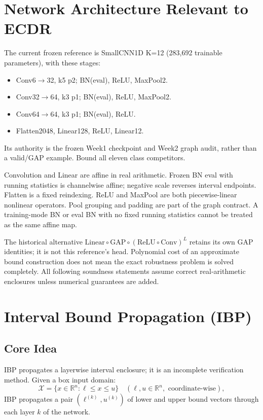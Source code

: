 \documentclass[11pt, a4paper]{article}
\theoremstyle{definition}
\theoremstyle{plain}
\newcommand{\R}{\mathbb{R}}
\begin{document}
\section{Network Architecture Relevant to ECDR}

The current frozen reference is SmallCNN1D K=12 (283,692 trainable
parameters), with these stages:
\begin{itemize}[leftmargin=1.5em]
\item Conv6$\to$32, k5 p2; BN(eval), ReLU, MaxPool2.
\item Conv32$\to$64, k3 p1; BN(eval), ReLU, MaxPool2.
\item Conv64$\to$64, k3 p1; BN(eval), ReLU.
\item Flatten2048, Linear128, ReLU, Linear12.
\end{itemize}
Its authority is the frozen Week1 checkpoint and Week2 graph audit, rather
than a valid/GAP example. Bound all eleven class competitors.

Convolution and Linear are affine in real arithmetic. Frozen BN eval with
running statistics is channelwise affine; negative scale reverses interval
endpoints. Flatten is a fixed reindexing. ReLU and MaxPool are both
piecewise-linear nonlinear operators. Pool grouping and padding are part of
the graph contract. A training-mode BN or eval BN with no fixed running
statistics cannot be treated as the same affine map.

The historical alternative
$\mathrm{Linear}\circ\mathrm{GAP}\circ(\mathrm{ReLU}\circ\mathrm{Conv})^L$
retains its own GAP identities; it is not this reference's head. Polynomial
cost of an approximate bound construction does not mean the exact robustness
problem is solved completely. All following soundness statements assume
correct real-arithmetic enclosures unless numerical guarantees are added.

\section{Interval Bound Propagation (IBP)}

\subsection{Core Idea}

IBP propagates a layerwise interval enclosure; it is an incomplete verification method.
Given a box input domain:
\[
  \mathcal{X} = \bigl\{ x \in \R^n : \ell \le x \le u \bigr\}
  \quad (\ell, u \in \R^n, \text{ coordinate-wise}),
\]
IBP propagates a pair $(\ell^{(k)}, u^{(k)})$ of lower and upper bound vectors
through each layer $k$ of the network.
\end{document}
